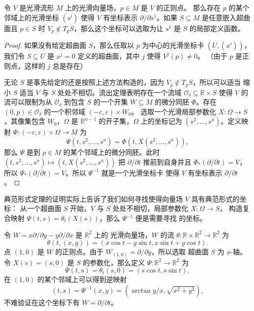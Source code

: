 \begin{theorem}[正则点附近的典范形式]
  令 $V$ 是光滑流形 $M$ 上的光滑向量场，$p\in M$ 是 $V$ 的正则点。
  那么存在 $p$ 的某个邻域上的光滑坐标 $(s^i)$ 使得 $V$ 有坐标表示
  $\partial/\partial s^1$。如果 $S\subseteq M$ 是任意嵌入超曲面且
  $p\in S$ 时 $V_p\notin T_pS$，那么这个坐标可以选取为让 $s^1$ 是 $S$
  的局部定义函数。
\end{theorem}
\begin{proof}
  如果没有给定超曲面 $S$，那么任取以 $p$ 为中心的光滑坐标卡 $(U,(x^i))$，
  我们令 $S\subseteq U$ 是 $x^j=0$ 定义的超曲面，其中 $j$ 使得 $V^j(p)\neq 0$。
  （由于 $p$ 是正则点，这样的 $j$ 总是存在）

  无论 $S$ 是事先给定的还是按照上述方法构造的，因为 $V_p\notin T_pS$，所以可以适当
  缩小 $S$ 适当 $V$ 与 $S$ 处处不相切。流出定理表明存在一个流域 $\mathcal{O}_\delta\subseteq \mathbb{R}\times S$
  使得 $V$ 的流可以限制为从 $\mathcal{O}_\delta$ 到包含 $S$ 的一个开集 $W\subseteq M$
  的微分同胚 $\varPhi$。存在 $(0,p)\in \mathcal{O}_\delta$ 的一个积邻域 $(-\varepsilon,\varepsilon)\times W_0$。
  选取一个光滑局部参数化 $X:\Omega\to S$，其像集包含 $W_0$，$\Omega$ 是 $\mathbb{R}^{n-1}$
  的开子集，$\Omega$ 上的坐标记为 $(s^2,\dots,s^n)$。定义映射 $\varPsi:(-\varepsilon,\varepsilon)\times \Omega\to M$
  为
  \[
    \varPsi(t,s^2,\dots,s^n)=\varPhi(t,X(s^2,\dots,s^n)),
  \]
  那么 $\varPsi$ 是到 $p\in M$ 的某个邻域上的微分同胚。此时 $(t,s^2,\dots,s^n)\mapsto (t,X(s^2,\dots,s^n))$
  把 $\partial/\partial t$ 推前到自身并且 $\varPhi_*(\partial/\partial t)=V$，
  所以 $\varPsi_*(\partial/\partial t)=V$。所以 $\varPsi^{-1}$ 就是一个光滑坐标卡
  使得 $V$ 有坐标表示 $\partial/\partial t$。
\end{proof}

典范形式定理的证明实际上告诉了我们如何寻找使得向量场 $V$ 具有典范形式的坐标：
从一个超曲面 $S$ 开始，$V$ 与 $S$ 处处不相切，局部参数化 $X:\Omega\to S$，
构造复合映射 $\varPsi(t,s)=\theta_t(X(s))$，那么 $\varPsi^{-1}$ 便是需要寻找
的坐标。

\begin{example}
  令 $W=x\partial/\partial y-y\partial/\partial x$ 是 $\mathbb{R}^2$ 上的
  光滑向量场，$W$ 的流 $\theta: \mathbb{R}\times \mathbb{R}^2\to \mathbb{R}^2$ 为
  \[
    \theta(t,(x,y))=(x\cos t-y\sin t,x\sin t+y\cos t).
  \]
  点 $(1,0)$ 是 $W$ 的正则点。由于 $W_{(1,0)}=\partial/\partial y$，所以选取
  超曲面 $S$ 为 $x$-轴。令 $X(s)=(s,0)$ 是 $S$ 的参数化，那么定义 $\varPsi:\mathbb{R}^2\to \mathbb{R}^2$
  为
  \[
    \varPsi(t,s)=\theta_t(s,0)=(s\cos t,s\sin t),
  \]
  在 $(1,0)$ 的某个邻域上可以得到逆映射
  \[
    (t,s)=\varPsi^{-1}(x,y)=\left(\arctan y/x, \sqrt{x^2+y^2}\right),
  \]
  不难验证在这个坐标下有 $W=\partial/\partial t$。
\end{example}




